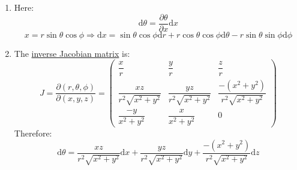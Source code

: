 \documentclass[12pt,a4]{article}
\newcommand{\e}{\mathrm{d}}
\begin{document}
\begin{enumerate}
\begin{enumerate}
\begin{align*}
        \end{align*}
        Now $\sqrt{g} = r^2 \sin \theta$ and $g^{\theta \theta} = -\frac{1}{r^2}$ and $g^{\phi\phi} = -\frac{1}{r^2 \sin^2\theta }$
        Therefore $\tensor{\epsilon}{^\theta ^\phi_t_r} = \sqrt{g} g^{\theta\theta} g^{\phi\phi} \sigma_{\theta\phi t r}$ and:
        \begin{align*}
          \e * F^{(4)} &= \e \left(Q \frac{Q}{r^2} \e t \wedge \e r\right)\\
                       &= 0 
        \end{align*}
      \item
        Here:
        \begin{equation*}
          \e \theta = \frac{\partial \theta }{ \partial x} \e x
        \end{equation*}
        \begin{equation*}
          x =  r \sin \theta \cos \phi \Rightarrow \e x = \sin \theta \cos \phi \e r + r \cos \theta \cos \phi \e \theta -  r \sin \theta \sin \phi \e \phi
        \end{equation*}
      \item
        The \href{https://en.wikipedia.org/wiki/Spherical_coordinate_system}{inverse Jacobian matrix} is:
        \begin{equation*}
          J = \frac{\partial(r, \theta, \phi)}{\partial (x, y, z)} =
          \left(
          \begin{matrix}
            \dfrac{x}{r}&\dfrac{y}{r}&\dfrac{z}{r}\\
            \dfrac{xz}{r^2\sqrt{x^2+y^2}}&\dfrac{yz}{r^2\sqrt{x^2+y^2}}&\dfrac{-\left(x^2 + y^2\right)}{r^2\sqrt{x^2+y^2}}\\
            \dfrac{-y}{x^2+y^2}&\dfrac{x}{x^2+y^2}&0
          \end{matrix}
          \right)
        \end{equation*}
        Therefore:
        \begin{equation*}
          \e \theta = \dfrac{xz}{r^2\sqrt{x^2+y^2}} \e x + \dfrac{yz}{r^2\sqrt{x^2+y^2}} \e y + \dfrac{-\left(x^2 + y^2\right)}{r^2\sqrt{x^2+y^2}} \e z

\end{equation*}
\end{enumerate}
\end{enumerate}
\end{document}
